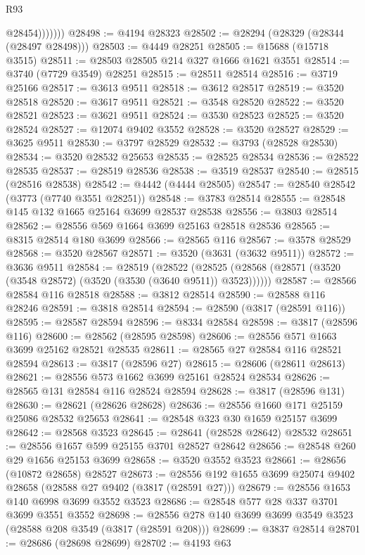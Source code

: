 \begin{lexlean}{R93}
\begin{coremodule}
                  @28454)))))))
@28498 := @4194 @28323
@28502 := @28294 (@28329 (@28344 (@28497 @28498)))
@28503 := @4449 @28251
@28505 := @15688 (@15718 @3515)
@28511 := @28503 @28505 @214 @327 @1666 @1621 @3551
@28514 := @3740 (@7729 @3549) @28251
@28515 := @28511 @28514
@28516 := @3719 @25166
@28517 := @3613 @9511
@28518 := @3612 @28517
@28519 := @3520 @28518
@28520 := @3617 @9511
@28521 := @3548 @28520
@28522 := @3520 @28521
@28523 := @3621 @9511
@28524 := @3530 @28523
@28525 := @3520 @28524
@28527 := @12074 @9402 @3552
@28528 := @3520 @28527
@28529 := @3625 @9511
@28530 := @3797 @28529
@28532 := @3793 (@28528 @28530)
@28534 := @3520 @28532 @25653
@28535 := @28525 @28534
@28536 := @28522 @28535
@28537 := @28519 @28536
@28538 := @3519 @28537
@28540 := @28515 (@28516 @28538)
@28542 := @4442 (@4444 @28505)
@28547 := @28540 @28542 (@3773 (@7740 @3551 @28251))
@28548 := @3783 @28514
@28555 := @28548 @145 @132 @1665 @25164 @3699 @28537 @28538
@28556 := @3803 @28514
@28562 := @28556 @569 @1664 @3699 @25163 @28518 @28536
@28565 := @8315 @28514 @180 @3699
@28566 := @28565 @116
@28567 := @3578 @28529
@28568 := @3520 @28567
@28571 := @3520 (@3631 (@3632 @9511))
@28572 := @3636 @9511
@28584 := @28519
    (@28522 (@28525 (@28568 (@28571 (@3520 (@3548 @28572) (@3520 (@3530 (@3640 @9511)) @3523))))))
@28587 := @28566 @28584 @116 @28518
@28588 := @3812 @28514
@28590 := @28588 @116 @28246
@28591 := @3818 @28514
@28594 := @28590 (@3817 (@28591 @116))
@28595 := @28587 @28594
@28596 := @8334 @28584
@28598 := @3817 (@28596 @116)
@28600 := @28562 (@28595 @28598)
@28606 := @28556 @571 @1663 @3699 @25162 @28521 @28535
@28611 := @28565 @27 @28584 @116 @28521 @28594
@28613 := @3817 (@28596 @27)
@28615 := @28606 (@28611 @28613)
@28621 := @28556 @573 @1662 @3699 @25161 @28524 @28534
@28626 := @28565 @131 @28584 @116 @28524 @28594
@28628 := @3817 (@28596 @131)
@28630 := @28621 (@28626 @28628)
@28636 := @28556 @1660 @171 @25159 @25086 @28532 @25653
@28641 := @28548 @323 @30 @1659 @25157 @3699
@28642 := @28568 @3523
@28645 := @28641 (@28528 @28642) @28532
@28651 := @28556 @1657 @599 @25155 @3701 @28527 @28642
@28656 := @28548 @260 @29 @1656 @25153 @3699
@28658 := @3520 @3552 @3523
@28661 := @28656 (@10872 @28658) @28527
@28673 := @28556 @192 @1655 @3699 @25074 @9402 @28658 (@28588 @27 @9402 (@3817 (@28591 @27)))
@28679 := @28556 @1653 @140 @6998 @3699 @3552 @3523
@28686 := @28548 @577 @28 @337 @3701 @3699 @3551 @3552
@28698 := @28556 @278 @140 @3699 @3699 @3549 @3523 (@28588 @208 @3549 (@3817 (@28591 @208)))
@28699 := @3837 @28514
@28701 := @28686 (@28698 @28699)
@28702 := @4193 @63

\end{coremodule}
\end{lexlean}
